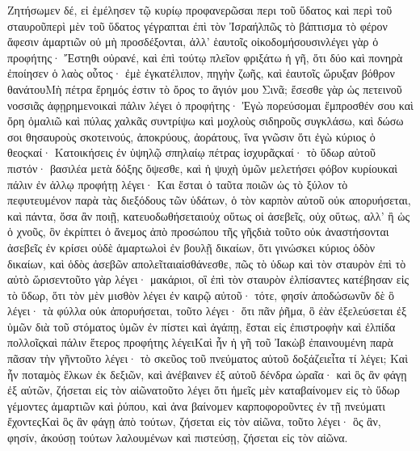 Ζητήσωμεν δέ, εἰ ἐμέλησεν τῷ κυρίῳ προφανερῶσαι περι τοῦ ὕδατος καὶ περὶ τοῦ σταυροῦπερὶ μὲν τοῦ ὕδατος γέγραπται ἐπὶ τὸν Ἰσραήλπῶς τὸ βάπτισμα τὸ φέρον ἄφεσιν ἁμαρτιῶν οὐ μὴ προσδέξονται, ἀλλ’ ἑαυτοῖς οἰκοδομήσουσινλέγει γὰρ ὁ προφήτης· Ἔστηθι οὐρανέ, καὶ ἐπὶ τούτῳ πλεῖον φριξάτω ἡ γῆ, ὅτι δύο καὶ πονηρὰ ἐποίησεν ὁ λαὸς οὗτος· ἐμὲ ἐγκατέλιπον, πηγὴν ζωῆς, καὶ ἑαυτοῖς ὤρυξαν βόθρον θανάτουΜὴ πέτρα ἔρημός ἐστιν τὸ ὄρος το ἅγιόν μου Σινᾶ; ἔσεσθε γὰρ ὡς πετεινοῦ νοσσιᾶς ἀφῃρημενοικαὶ πάλιν λέγει ὁ προφήτης· Ἐγὼ πορεύσομαι ἔμπροσθέν σου καὶ ὄρη ὁμαλιῶ καὶ πύλας χαλκᾶς συντρίψω καὶ μοχλοὺς σιδηροῦς συγκλάσω, καὶ δώσω σοι θησαυροὺς σκοτεινούς, ἀποκρύους, ἀοράτους, ἵνα γνῶσιν ὅτι ἐγὼ κύριος ὁ θεοςκαί· Κατοικήσεις ἐν ὑψηλῷ σπηλαίῳ πέτρας ἰσχυρᾶςκαί· τὸ ὕδωρ αὐτοῦ πιστόν· βασιλέα μετὰ δόξης ὄψεσθε, καὶ ἡ ψυχὴ ὑμῶν μελετήσει φόβον κυρίουκαὶ πάλιν ἐν ἀλλῳ προφήτῃ λέγει· Και ἔσται ὁ ταῦτα ποιῶν ὡς τὸ ξύλον τὸ πεφυτευμένον παρὰ τὰς διεξόδους τῶν ὑδάτων, ὁ τὸν καρπὸν αὐτοῦ οὐκ απορυήσεται, καὶ πάντα, ὅσα ἂν ποιῇ, κατευοδωθήσεταιοὐχ οὕτως οἱ ἀσεβεῖς, οὐχ οὕτως, αλλ’ ἢ ὡς ὁ χνοῦς, ὃν ἐκρίπτει ὁ ἄνεμος ἀπὸ προσώπου τῆς γῆςδιὰ τοῦτο οὐκ ἀναστήσονται ἀσεβεῖς ἐν κρίσει οὐδὲ ἁμαρτωλοὶ ἐν βουλῇ δικαίων, ὅτι γινώσκει κύριος ὁδὸν δικαίων, καὶ ὁδὸς ἀσεβῶν απολεῖταιαἰσθάνεσθε, πῶς τὸ ὑδωρ καὶ τὸν σταυρὸν ἐπὶ τὸ αὐτὸ ὥρισεντοῦτο γὰρ λέγει· μακάριοι, οἳ ἐπὶ τὸν σταυρὸν ἐλπίσαντες κατέβησαν εἰς τὸ ὕδωρ, ὅτι τὸν μὲν μισθὸν λέγει ἐν καιρῷ αὐτοῦ· τότε, φησίν ἀποδώσωνῦν δὲ ὃ λέγει· τὰ φύλλα οὐκ ἀπορυήσεται, τοῦτο λέγει· ὅτι πᾶν ῥῆμα, ὃ ἐὰν ἐξελεύσεται ἐξ ὑμῶν διὰ τοῦ στόματος ὑμῶν ἐν πίστει καὶ ἀγάπῃ, ἔσται εἰς ἐπιστροφὴν καὶ ἐλπίδα πολλοῖςκαὶ πάλιν ἕτερος προφήτης λέγειΚαὶ ἦν ἡ γῆ τοῦ Ἰακὼβ ἐπαινουμένη παρὰ πᾶσαν τὴν γῆντοῦτο λέγει· τὸ σκεῦος τοῦ πνεύματος αὐτοῦ δοξάζειεἶτα τί λέγει; Καὶ ἦν ποταμὸς ἕλκων ἐκ δεξιῶν, καὶ ἀνέβαινεν ἐξ αὐτοῦ δένδρα ὡραῖα· καὶ ὃς ἂν φάγῃ ἐξ αὐτῶν, ζήσεται εἰς τὸν αἰῶνατοῦτο λέγει ὅτι ἡμεῖς μὲν καταβαίνομεν εἰς τὸ ὕδωρ γέμοντες ἁμαρτιῶν καὶ ῥύπου, καὶ ἀνα βαίνομεν καρποφοροῦντες ἐν τῇ πνεύματι ἔχοντεςΚαὶ ὃς ἂν φάγῃ ἀπὸ τούτων, ζήσεται εἰς τὸν αἰῶνα, τοῦτο λέγει· ὃς ἂν, φησίν, ἀκούσῃ τούτων λαλουμένων καὶ πιστεύσῃ, ζήσεται εἰς τὸν αἰῶνα.
